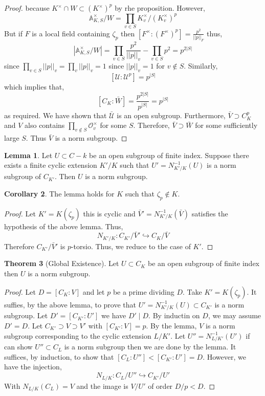 \documentclass[12pt]{extarticle}
\newcommand{\divides}{\mid}
\newcommand{\ints}[1]{\mathcal{O}_{#1}}
\theoremstyle{definition}
\newtheorem{theorem}{Theorem}[section]
\newtheorem{lemma}[theorem]{Lemma}
\newtheorem{corollary}[theorem]{Corollary}
\begin{document}
\begin{proof}
because $K^\times \cap W \subset (K^\times)^p$ by rhe proposition.  However, 
\[ \mathbb{A}_{K, S}^\times / W = \prod_{v \in S} K_v^\times / (K_v^\times)^p \]
But if $F$ is a local field containing $\zeta_p$ then $[ F^\times : (F^\times)^p ] = \frac{ p^2 }{ || p ||_F}$ thus,
\[ | \mathbb{A}_{K,S}^\times / W | = \prod_{v \in S} \frac{p^2}{|| p ||_v} - \prod_{v \in S} p^2 = p^{2 |S|} \]
since $\prod_{v \in S} || p ||_v = \prod_v ||p ||_v = 1$ since $||p||_v = 1$ for $v \notin S$. Similarly,
\[  [ \mathcal{U} : \mathcal{U}^p ] = p^{|S|} \]
which implies that,
\[ [C_K : \bar{W} ] = \frac{ p^{2 |S|} }{ p^{|S|} } = p^{|S|} \]
as required. We have shown that $\bar{\mathcal{U}}$ is an open subgroup. Furthermore, $\bar{V} \supset C_K^p$ and $V$ also contains $\prod_{v \notin S} \ints{v}^\times$ for some $S$. Therefore, $\bar{V} \supset \bar{W}$ for some sufficiently large $S$. Thus $\bar{V}$ is a norm subgroup.  
\end{proof}

\begin{lemma}
Let $U \subset C-k$ be an open subgroup of finite index. Suppose there exists a finite cyclic extension $K' / K $ such that $U' = N_{K'/K}^{-1}(U)$ is a norm subgroup of $C_{K'}$. Then $U$ is a norm subgroup.
\end{lemma}

\begin{corollary}
The lemma holds for $K$ such that $\zeta_p \notin K$. 
\end{corollary}

\begin{proof}
Let $K' = K(\zeta_p)$ this is cyclic and $\bar{V}' = N_{K'/K}^{-1}(\bar{V})$ satisfies the hypothesis of the above lemma. Thus,
\[ N_{K'/K} : C_{K'} / \bar{V}' \hookrightarrow C_K / \bar{V} \]
Therefore $C_{K'} / \bar{V}'$ is $p$-torsio. Thus, we reduce to the case of $K'$.
\end{proof}

\begin{theorem}[Global Existence]
Let $U \subset C_K$ be an open subgroup of finite index then $U$ is a norm subgroup.
\end{theorem}

\begin{proof}
Let $D = [C_K : V]$ and let $p$ be a prime dividing $D$. Take $K' = K(\zeta_p)$. It suffies, by the above lemma, to prove that $U' = N_{K'/K}^{-1}(U) \subset C_{K'}$ is a norm subgroup. Let $D' = [C_{K'} : U' ] $ we have $D' \divides D$. By inductin on $D$, we may assume $D' = D$. Let $C_{K'} \supset V \supset V'$ with $[C_{K'} : V] = p$. By the lemma, $V$ is a norm subgroup corresponding to the cyclic extension $L/K'$. Let $U'' = N_{L/K'}^{-1}(U')$ if can show $U'' \subset C_L$ is a norm subgroup then we are done by the lemma. It suffices, by induction, to show that $[C_L : U''] < [C_{K'} : U' ] = D$. However, we have the injection,
\[ N_{L/K} : C_L / U'' \hookrightarrow C_{K'} / U' \]
With $N_{L/K}(C_L) = V$ and the image is $V / U'$ of order $D/p < D$.
\end{proof}
\end{document}
